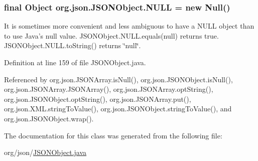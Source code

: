 \hypertarget{classorg_1_1json_1_1_j_s_o_n_object_a01c74a31a1abfd34ab13beb9347855ac}{
\subsubsection[{N\-U\-L\-L}]{\setlength{\rightskip}{0pt plus 5cm}final Object org.\-json.\-J\-S\-O\-N\-Object.\-N\-U\-L\-L = new {\bf Null}()\hspace{0.3cm}{\ttfamily [static]}}}\label{classorg_1_1json_1_1_j_s_o_n_object_a01c74a31a1abfd34ab13beb9347855ac}
It is sometimes more convenient and less ambiguous to have a {\ttfamily N\-U\-L\-L} object than to use Java's {\ttfamily null} value. {\ttfamily J\-S\-O\-N\-Object.\-N\-U\-L\-L.\-equals(null)} returns {\ttfamily true}. {\ttfamily J\-S\-O\-N\-Object.\-N\-U\-L\-L.\-to\-String()} returns {\ttfamily \char`\"{}null\char`\"{}}. 

Definition at line 159 of file J\-S\-O\-N\-Object.\-java.



Referenced by org.\-json.\-J\-S\-O\-N\-Array.\-is\-Null(), org.\-json.\-J\-S\-O\-N\-Object.\-is\-Null(), org.\-json.\-J\-S\-O\-N\-Array.\-J\-S\-O\-N\-Array(), org.\-json.\-J\-S\-O\-N\-Array.\-opt\-String(), org.\-json.\-J\-S\-O\-N\-Object.\-opt\-String(), org.\-json.\-J\-S\-O\-N\-Array.\-put(), org.\-json.\-X\-M\-L.\-string\-To\-Value(), org.\-json.\-J\-S\-O\-N\-Object.\-string\-To\-Value(), and org.\-json.\-J\-S\-O\-N\-Object.\-wrap().



The documentation for this class was generated from the following file\-:\begin{DoxyCompactItemize}
\item 
org/json/\hyperlink{_j_s_o_n_object_8java}{J\-S\-O\-N\-Object.\-java}\end{DoxyCompactItemize}
